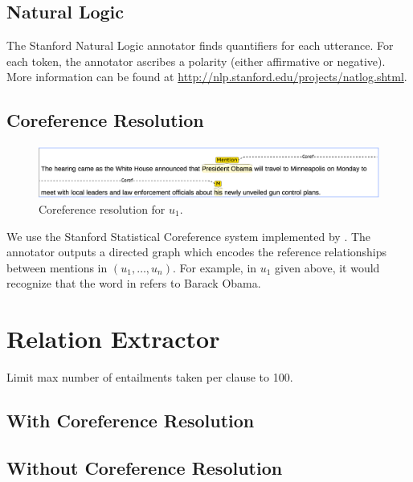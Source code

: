 \subsection{Natural Logic}
The Stanford Natural Logic annotator finds
quantifiers for each utterance. For each token,
the annotator ascribes a polarity (either affirmative
or negative).
More information can be found at 
\url{http://nlp.stanford.edu/projects/natlog.shtml}.
\subsection{Coreference Resolution}

\begin{figure}
\includegraphics[scale=0.33]{figures/coref.png}
\caption{
\label{fig:coref}
Coreference resolution for $u_1$.
}
\end{figure}

We use the Stanford Statistical Coreference system implemented by
\citet{clark2015coref}. The annotator outputs a directed graph
which encodes the reference relationships between mentions in 
$(u_1,\dots,u_n)$. For example, in $u_1$ given above, it would
recognize that the word  in 
refers to Barack Obama.

\section{Relation Extractor}
Limit max number of entailments taken per clause to 100.
\citet{angeli2015openie}
\citet{fader11reverb}

\subsection{With Coreference Resolution}

\subsection{Without Coreference Resolution}
